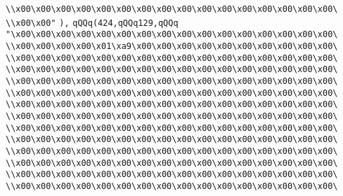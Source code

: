 \verb|\\x00\x00\x00\x00\x00\x00\x00\x00\x00\x00\x00\x00\x00\x00\x00\x00\|\newline
\verb|\\x00\x00"|\newline
\verb|),|\newline
\verb|qQQq(424,qQQq129,qQQq|\newline
\verb|"\x00\x00\x00\x00\x00\x00\x00\x00\x00\x00\x00\x00\x00\x00\x00\x00\|\newline
\verb|\\x00\x00\x00\x00\x01\xa9\x00\x00\x00\x00\x00\x00\x00\x00\x00\x00\|\newline
\verb|\\x00\x00\x00\x00\x00\x00\x00\x00\x00\x00\x00\x00\x00\x00\x00\x00\|\newline
\verb|\\x00\x00\x00\x00\x00\x00\x00\x00\x00\x00\x00\x00\x00\x00\x00\x00\|\newline
\verb|\\x00\x00\x00\x00\x00\x00\x00\x00\x00\x00\x00\x00\x00\x00\x00\x00\|\newline
\verb|\\x00\x00\x00\x00\x00\x00\x00\x00\x00\x00\x00\x00\x00\x00\x00\x00\|\newline
\verb|\\x00\x00\x00\x00\x00\x00\x00\x00\x00\x00\x00\x00\x00\x00\x00\x00\|\newline
\verb|\\x00\x00\x00\x00\x00\x00\x00\x00\x00\x00\x00\x00\x00\x00\x00\x00\|\newline
\verb|\\x00\x00\x00\x00\x00\x00\x00\x00\x00\x00\x00\x00\x00\x00\x00\x00\|\newline
\verb|\\x00\x00\x00\x00\x00\x00\x00\x00\x00\x00\x00\x00\x00\x00\x00\x00\|\newline
\verb|\\x00\x00\x00\x00\x00\x00\x00\x00\x00\x00\x00\x00\x00\x00\x00\x00\|\newline
\verb|\\x00\x00\x00\x00\x00\x00\x00\x00\x00\x00\x00\x00\x00\x00\x00\x00\|\newline
\verb|\\x00\x00\x00\x00\x00\x00\x00\x00\x00\x00\x00\x00\x00\x00\x00\x00\|\newline
\verb|\\x00\x00\x00\x00\x00\x00\x00\x00\x00\x00\x00\x00\x00\x00\x00\x00\|\newline
